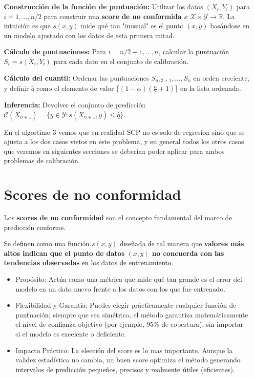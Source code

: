 \begin{algorithm}[H]
\caption{SCP caso general}
\label{alg:conformal_prediction_gen}
    \begin{algorithmic}[1]
    \STATE \textbf{Construcción de la función de puntuación:} Utilizar los datos $(X_i, Y_i)$ para $i = 1, \dots, n/2$ para construir una \textbf{score de no conformida} $s : \mathcal{X} \times \mathcal{Y} \to \mathbb{R}$.
    La intuición es que $s(x, y)$ mide qué tan "inusual"  es el punto $(x, y)$ basándose en un modelo ajustado con los datos de esta primera mitad.

    \STATE \textbf{Cálculo de puntuaciones:} Para $i = n/2 + 1, \dots, n$, calcular la puntuación $S_i = s(X_i, Y_i)$ para cada dato en el conjunto de calibración.

    \STATE \textbf{Cálculo del cuantil:} Ordenar las puntuaciones $S_{n/2+1}, \dots, S_n$ en orden creciente, y definir $\hat{q}$ como el elemento de valor $\lceil(1 - \alpha)(\frac{n}{2} + 1)\rceil$ en la lista ordenada.

    \STATE \textbf{Inferencia:} Devolver el conjunto de predicción $\mathcal{C}(X_{n+1}) = \{y \in \mathcal{Y} : s(X_{n+1}, y) \leq \hat{q}\}$.
    \end{algorithmic}
\end{algorithm}

En el algortimo 3 vemos que en realidad SCP no es solo de regresion sino que se ajusta a los dos casos vistos en este problema, y en general todos los otros casos que veremos en siguientes secciones se deberian poder aplicar para ambos problemas de calibración.


\section{Scores de no conformidad}

Los \textbf{scores de no conformidad} son el concepto fundamental del marco de predicción conforme.

Se definen como una función $s(x, y)$ diseñada de tal manera que \textbf{valores más altos indican que el punto de datos $(x, y)$ no concuerda con las tendencias observadas} en los datos de entrenamiento.

\begin{itemize}
    \item Propósito: Actúa como una métrica que mide qué tan grande es el error del modelo en un dato nuevo frente a los datos con los que fue entrenado.

    \item Flexibilidad y Garantía: Puedes elegir prácticamente cualquier función de puntuación; siempre que sea simétrica, el método garantiza matemáticamente el nivel de confianza objetivo (por ejemplo, 95\% de cobertura), sin importar si el modelo es excelente o deficiente.

    \item Impacto Práctico: La elección del score es lo mas importante. Aunque la validez estadística no cambia, un buen score optimiza el método generando intervalos de predicción pequeños, precisos y realmente útiles (eficientes).
\end{itemize}


